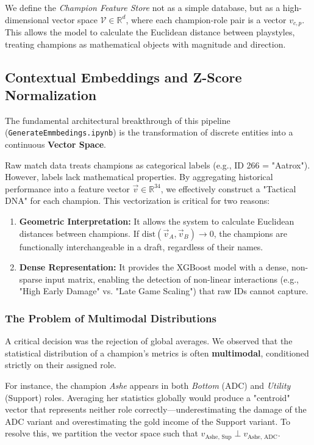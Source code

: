 \documentclass[12pt, a4paper]{article}
\begin{document}
    We define the \textit{Champion Feature Store} not as a simple database, but as a high-dimensional vector space $\mathcal{V} \in \mathbb{R}^{d}$, where each champion-role pair is a vector $v_{c,p}$. This allows the model to calculate the Euclidean distance between playstyles, treating champions as mathematical objects with magnitude and direction.

    \subsection{Contextual Embeddings and Z-Score Normalization}

    The fundamental architectural breakthrough of this pipeline (\texttt{GenerateEmmbedings.ipynb}) is the transformation of discrete entities into a continuous \textbf{Vector Space}.

    Raw match data treats champions as categorical labels (e.g., ID 266 = "Aatrox"). However, labels lack mathematical properties. By aggregating historical performance into a feature vector $\vec{v} \in \mathbb{R}^{34}$, we effectively construct a "Tactical DNA" for each champion. This vectorization is critical for two reasons:
    \begin{enumerate}
        \item \textbf{Geometric Interpretation:} It allows the system to calculate Euclidean distances between champions. If $\text{dist}(\vec{v}_{A}, \vec{v}_{B}) \rightarrow 0$, the champions are functionally interchangeable in a draft, regardless of their names.
        \item \textbf{Dense Representation:} It provides the XGBoost model with a dense, non-sparse input matrix, enabling the detection of non-linear interactions (e.g., "High Early Damage" vs. "Late Game Scaling") that raw IDs cannot capture.
    \end{enumerate}

    \subsubsection{The Problem of Multimodal Distributions}
    A critical decision was the rejection of global averages. We observed that the statistical distribution of a champion's metrics is often \textbf{multimodal}, conditioned strictly on their assigned role.

    For instance, the champion \textit{Ashe} appears in both \textit{Bottom} (ADC) and \textit{Utility} (Support) roles. Averaging her statistics globally would produce a "centroid" vector that represents neither role correctly—underestimating the damage of the ADC variant and overestimating the gold income of the Support variant. To resolve this, we partition the vector space such that $v_{\text{Ashe, Sup}} \perp v_{\text{Ashe, ADC}}$.
\end{document}
